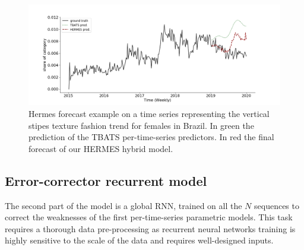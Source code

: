 \documentclass[10pt]{article} %
\begin{document}
\begin{figure}
\centering
  \includegraphics[width=\linewidth]{br_female_texture_verticalstripe}
\caption{Hermes forecast example on a time series representing the vertical stipes texture fashion trend for females in Brazil. In green the prediction of the TBATS per-time-series predictors. In red the final forecast of our HERMES hybrid model.}
\label{fig:introexamples}
\end{figure}

\subsection{Error-corrector recurrent model}

The second part of the model is a global RNN, trained on all the $N$ sequences to correct the weaknesses of the first per-time-series parametric models. This task requires a thorough data pre-processing as recurrent neural networks training is highly sensitive to the scale of the data and requires well-designed inputs.
\end{document}
